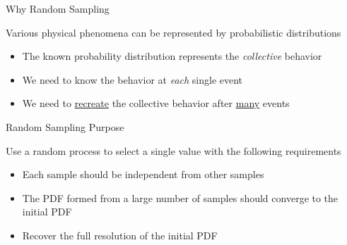 \documentclass[xcolor=x11names,compress]{beamer}
\renewcommand{\(}{\begin{columns}}
\renewcommand{\)}{\end{columns}}
\newcommand{\<}[1]{\begin{column}{#1}}
\renewcommand{\>}{\end{column}}
\begin{document}
\begin{frame}{Why Random Sampling}

Various physical phenomena can be
represented by probabilistic distributions

\begin{itemize}
    \item The known probability distribution
represents the \textit{collective} behavior
\vspace*{1em}
    \item We need to know the behavior at \textit{each}
single event
\vspace*{1em}
    \item We need to \underline{recreate} the collective behavior after \underline{many} events
\end{itemize}

\end{frame}


\begin{frame}{Random Sampling Purpose}

Use a random process to select a single
value with the following requirements

\begin{itemize}
    \item Each sample should be independent from
other samples
\vspace*{1em}
    \item The PDF formed from a large number of
samples should converge to the initial PDF
\vspace*{1em}
    \item Recover the full resolution of the initial PDF
\end{itemize}

\end{frame}
\end{document}
